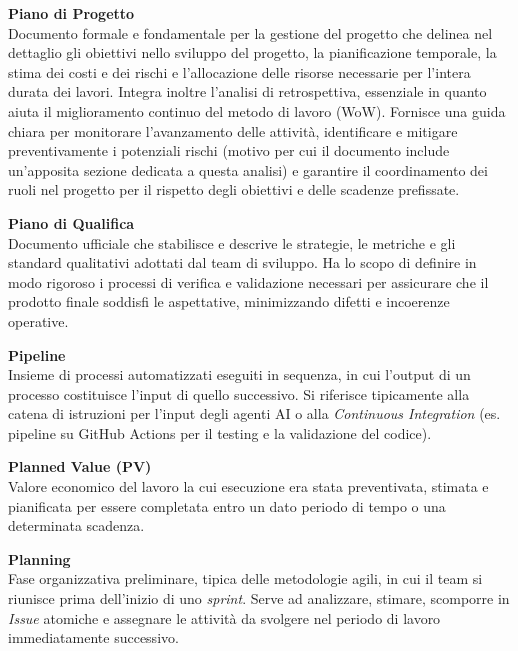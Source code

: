 \documentclass[12pt, a4paper]{article}
\begin{document}
\noindent\hypertarget{piano-di-progetto}{\textbf{Piano di Progetto}} \\[0.1em]
Documento formale e fondamentale per la gestione del progetto che delinea nel dettaglio gli obiettivi nello sviluppo del progetto, la pianificazione temporale, la stima dei costi e dei rischi e l'allocazione delle risorse necessarie per l'intera durata dei lavori. Integra inoltre l'analisi di retrospettiva, essenziale in quanto aiuta il miglioramento continuo del metodo di lavoro (WoW). Fornisce una guida chiara per monitorare l'avanzamento delle attività, identificare e mitigare preventivamente i potenziali rischi (motivo per cui il documento include un'apposita sezione dedicata a questa analisi) e garantire il coordinamento dei ruoli nel progetto per il rispetto degli obiettivi e delle scadenze prefissate.
\vspace{0.5cm}

\newpage
\noindent\hypertarget{piano-di-qualifica}{\textbf{Piano di Qualifica}} \\[0.1em]
Documento ufficiale che stabilisce e descrive le strategie, le metriche e gli standard qualitativi adottati dal team di sviluppo. Ha lo scopo di definire in modo rigoroso i processi di verifica e validazione necessari per assicurare che il prodotto finale soddisfi le aspettative, minimizzando difetti e incoerenze operative.
\vspace{0.5cm}

\noindent\hypertarget{pipeline}{\textbf{Pipeline}} \\[0.1em]
Insieme di processi automatizzati eseguiti in sequenza, in cui l'output di un processo costituisce l'input di quello successivo. Si riferisce tipicamente alla catena di istruzioni per l'input degli agenti AI o alla \textit{Continuous Integration} (es. pipeline su GitHub Actions per il testing e la validazione del codice).
\vspace{0.5cm}

\noindent\hypertarget{planned-value}{\textbf{Planned Value (PV)}} \\[0.1em]
Valore economico del lavoro la cui esecuzione era stata preventivata, stimata e pianificata per essere completata entro un dato periodo di tempo o una determinata scadenza.
\vspace{0.5cm}

\noindent\hypertarget{planning}{\textbf{Planning}} \\[0.1em]
Fase organizzativa preliminare, tipica delle metodologie agili, in cui il team si riunisce prima dell'inizio di uno \textit{sprint}. Serve ad analizzare, stimare, scomporre in \textit{Issue} atomiche e assegnare le attività da svolgere nel periodo di lavoro immediatamente successivo.
\vspace{0.5cm}
\end{document}
